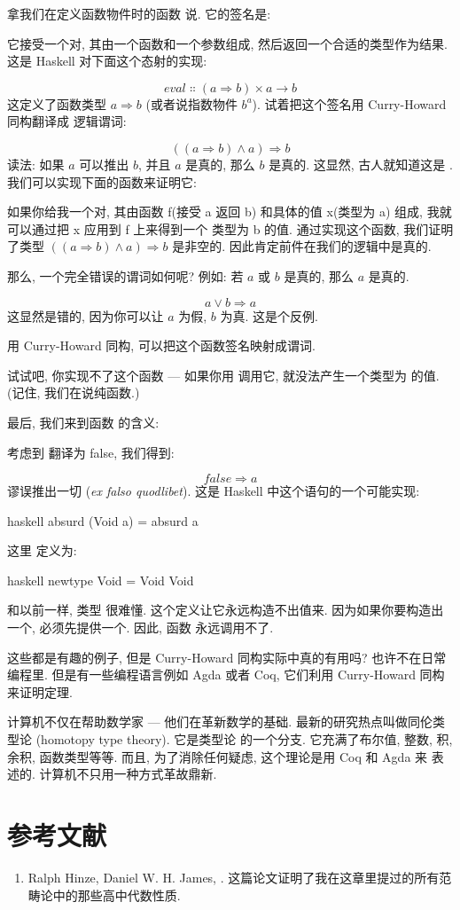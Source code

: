 拿我们在定义函数物件时的函数  说. 它的签名是:

它接受一个对, 其由一个函数和一个参数组成, 然后返回一个合适的类型作为结果. 这是 Haskell 对下面这个态射的实现:

\[eval \Colon (a \Rightarrow b) \times a \to b\]
这定义了函数类型 $a \Rightarrow b$ (或者说指数物件 $b^{a}$). 试着把这个签名用 Curry-Howard 同构翻译成
逻辑谓词:

\[((a \Rightarrow b) \wedge a) \Rightarrow b\]
读法: 如果 $a$ 可以推出 $b$, 并且 $a$ 是真的, 那么 $b$ 是真的. 这显然, 古人就知道这是 .
我们可以实现下面的函数来证明它:

如果你给我一个对, 其由函数 f(接受 a 返回 b) 和具体的值 x(类型为 a) 组成, 我就可以通过把 x 应用到 f 上来得到一个
类型为 b 的值. 通过实现这个函数, 我们证明了类型 $((a \Rightarrow b) \wedge a) \Rightarrow b$ 是非空的.
因此肯定前件在我们的逻辑中是真的.

那么, 一个完全错误的谓词如何呢? 例如: 若 $a$ 或 $b$ 是真的, 那么 $a$ 是真的.

\[a \vee b \Rightarrow a\]
这显然是错的, 因为你可以让 $a$ 为假, $b$ 为真. 这是个反例.

用 Curry-Howard 同构, 可以把这个函数签名映射成谓词.

试试吧, 你实现不了这个函数 --- 如果你用  调用它, 就没法产生一个类型为  的值.
(记住, 我们在说纯函数.)

最后, 我们来到函数  的含义:

考虑到  翻译为 false, 我们得到:

\[false \Rightarrow a\]
谬误推出一切 (\emph{ex falso quodlibet}). 这是 Haskell 中这个语句的一个可能实现:

\begin{snip}{haskell}
absurd (Void a) = absurd a
\end{snip}
这里  定义为:

\begin{snip}{haskell}
newtype Void = Void Void
\end{snip}
和以前一样, 类型  很难懂. 这个定义让它永远构造不出值来. 因为如果你要构造出一个, 必须先提供一个.
因此, 函数  永远调用不了.

这些都是有趣的例子, 但是 Curry-Howard 同构实际中真的有用吗? 也许不在日常编程里. 但是有一些编程语言例如 Agda 或者
Coq, 它们利用 Curry-Howard 同构来证明定理.

计算机不仅在帮助数学家 --- 他们在革新数学的基础. 最新的研究热点叫做同伦类型论 (homotopy type theory). 它是类型论
的一个分支. 它充满了布尔值, 整数, 积, 余积, 函数类型等等. 而且, 为了消除任何疑虑, 这个理论是用 Coq 和 Agda 来
表述的. 计算机不只用一种方式革故鼎新.

\section{参考文献}

\begin{enumerate}
  \tightlist
  \item
        Ralph Hinze, Daniel W. H. James,
        . 这篇论文证明了我在这章里提过的所有范畴论中的那些高中代数性质.
\end{enumerate}
